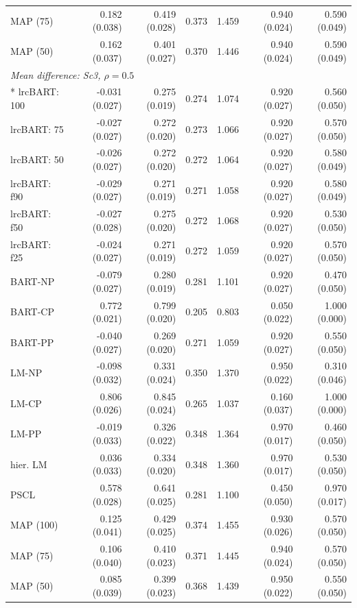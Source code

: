 \begin{landscape}
\begin{longtable}{lrrrrrr}
MAP (75) & 0.182 (0.038) & 0.419 (0.028) & 0.373 & 1.459 & 0.940 (0.024) & 0.590 (0.049) \\
MAP (50) & 0.162 (0.037) & 0.401 (0.027) & 0.370 & 1.446 & 0.940 (0.024) & 0.590 (0.049) \\
\multicolumn{7}{l}{\strut\textit{Mean difference: Sc3, $\rho=0.5$}}\\*
lrcBART: 100 & -0.031 (0.027) & 0.275 (0.019) & 0.274 & 1.074 & 0.920 (0.027) & 0.560 (0.050) \\
lrcBART: 75 & -0.027 (0.027) & 0.272 (0.020) & 0.273 & 1.066 & 0.920 (0.027) & 0.570 (0.050) \\
lrcBART: 50 & -0.026 (0.027) & 0.272 (0.020) & 0.272 & 1.064 & 0.920 (0.027) & 0.580 (0.049) \\
lrcBART: f90 & -0.029 (0.027) & 0.271 (0.019) & 0.271 & 1.058 & 0.920 (0.027) & 0.580 (0.049) \\
lrcBART: f50 & -0.027 (0.028) & 0.275 (0.020) & 0.272 & 1.068 & 0.920 (0.027) & 0.530 (0.050) \\
lrcBART: f25 & -0.024 (0.027) & 0.271 (0.019) & 0.272 & 1.059 & 0.920 (0.027) & 0.570 (0.050) \\
BART-NP & -0.079 (0.027) & 0.280 (0.019) & 0.281 & 1.101 & 0.920 (0.027) & 0.470 (0.050) \\
BART-CP & 0.772 (0.021) & 0.799 (0.020) & 0.205 & 0.803 & 0.050 (0.022) & 1.000 (0.000) \\
BART-PP & -0.040 (0.027) & 0.269 (0.020) & 0.271 & 1.059 & 0.920 (0.027) & 0.550 (0.050) \\
LM-NP & -0.098 (0.032) & 0.331 (0.024) & 0.350 & 1.370 & 0.950 (0.022) & 0.310 (0.046) \\
LM-CP & 0.806 (0.026) & 0.845 (0.024) & 0.265 & 1.037 & 0.160 (0.037) & 1.000 (0.000) \\
LM-PP & -0.019 (0.033) & 0.326 (0.022) & 0.348 & 1.364 & 0.970 (0.017) & 0.460 (0.050) \\
hier. LM & 0.036 (0.033) & 0.334 (0.020) & 0.348 & 1.360 & 0.970 (0.017) & 0.530 (0.050) \\
PSCL & 0.578 (0.028) & 0.641 (0.025) & 0.281 & 1.100 & 0.450 (0.050) & 0.970 (0.017) \\
MAP (100) & 0.125 (0.041) & 0.429 (0.025) & 0.374 & 1.455 & 0.930 (0.026) & 0.570 (0.050) \\
MAP (75) & 0.106 (0.040) & 0.410 (0.023) & 0.371 & 1.445 & 0.940 (0.024) & 0.570 (0.050) \\
MAP (50) & 0.085 (0.039) & 0.399 (0.023) & 0.368 & 1.439 & 0.950 (0.022) & 0.550 (0.050) \\

\end{longtable}
\end{landscape}
